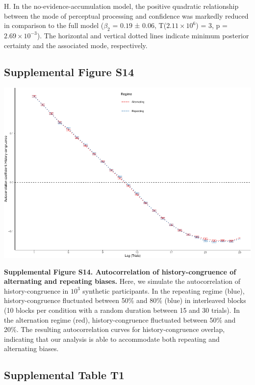 \documentclass[
]{article}
\begin{document}
H. In the no-evidence-accumulation model, the positive quadratic
relationship between the mode of perceptual processing and confidence
was markedly reduced in comparison to the full model (\(\beta_2\) =
\(0.19\) ± \(0.06\), T(\(\ensuremath{2.11\times 10^{6}}\)) = \(3\), p =
\(\ensuremath{2.69\times 10^{-3}}\)). The horizontal and vertical dotted
lines indicate minimum posterior certainty and the associated mode,
respectively.

\newpage

\hypertarget{supplemental-figure-s14}{%
\subsection{Supplemental Figure S14}\label{supplemental-figure-s14}}

\includegraphics{modes_mouse_rev1b_files/figure-latex/Supplemental_Figure_S14-1.pdf}

\textbf{Supplemental Figure S14. Autocorrelation of history-congruence
of alternating and repeating biases.} Here, we simulate the
autocorrelation of history-congruence in \(\ensuremath{10^{3}}\)
synthetic participants. In the repeating regime (blue),
history-congruence fluctuated between 50\% and 80\% (blue) in
interleaved blocks (10 blocks per condition with a random duration
between 15 and 30 trials). In the alternation regime (red),
history-congruence fluctuated between 50\% and 20\%. The resulting
autocorrelation curves for history-congruence overlap, indicating that
our analysis is able to accommodate both repeating and alternating
biases.

\newpage

\hypertarget{supplemental-table-t1}{%
\subsection{Supplemental Table T1}\label{supplemental-table-t1}}
\end{document}
